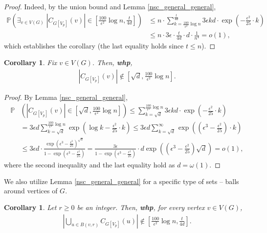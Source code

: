 \documentclass[notitlepage]{scrartcl}
\newtheorem{corollary}[thm]{Corollary}
\begin{document}
\begin{proof}
    Indeed, by the union bound and Lemma \ref{nsc_general_general},
    \begin{align*}
        \mathbb{P}\left(\exists_{v\in V(G)}\; \left|C_{G[V_p]}(v)\right|\in \left[\frac{100}{\epsilon^2}\log n, \frac{t}{4d}\right]\right)&\le n\cdot \sum_{k=\frac{100}{\epsilon^2}\log n}^{\frac{t}{4d}} 3\epsilon kd\cdot \exp\left(-\frac{\epsilon^2}{25}\cdot k\right)\\
        &\le n\cdot 3\epsilon \cdot \frac{t}{4d}\cdot d\cdot \frac{1}{n^4}=o(1),
    \end{align*}
    which establishes the corollary (the last equality holds since $t\le n$). 
\end{proof}

\begin{corollary}\label{nsc1_pre}
    Fix $v\in V(G)$. Then, \textbf{whp}, 
        \begin{align*}
            |C_{G[V_p]}(v)|\notin \left[\sqrt{d}, \frac{100}{\epsilon^2}\log n\right].
        \end{align*}
\end{corollary}

\begin{proof}
By Lemma \ref{nsc_general_general},
    \begin{align*}
        \mathbb{P}&\left( |C_{G[V_p]}(v)|\in \left[\sqrt{d},\frac{100}{\epsilon^2}\log n\right]\right)\le \sum_{k=\sqrt{d}}^{\frac{100}{\epsilon^2}\log n} 3\epsilon kd\cdot \exp\left(-\frac{\epsilon^2}{25}\cdot k\right)\\
        &=3\epsilon d \sum_{k=\sqrt{d}}^{\frac{100}{\epsilon^2}\log n}\exp\left(\log k-\frac{\epsilon^2}{25}\cdot k\right)\le 3\epsilon d \sum_{k=\sqrt{d}}^{\infty}\exp\left(\left(\epsilon^3-\frac{\epsilon^2}{25}\right)\cdot k\right)\\
        &\le 3\epsilon d\cdot \frac{\exp\left(\epsilon^3-\frac{\epsilon^2}{25}\right)^{\sqrt{d}}}{1-\exp\left(\epsilon^3-\frac{\epsilon^2}{25}\right)}=\frac{3\epsilon}{1-\exp\left(\epsilon^3-\frac{\epsilon^2}{25}\right)}\cdot d\exp\left(\left(\epsilon^3-\frac{\epsilon^2}{25}\right)\sqrt{d}\right)=o(1),
    \end{align*}
    where the second inequality and the last equality hold as $d=\omega(1)$.
\end{proof}

We also utilize Lemma \ref{nsc_general_general} for a specific type of sets -- balls around vertices of $G$.

\begin{corollary}\label{nsc_ball_pre}
    Let $r\ge 0$ be an integer. Then, \textbf{whp}, for every vertex $v\in V(G)$,
        \begin{align*}
            \left|\bigcup_{u\in B(v,r)} C_{G[V_p]}(u)\right|\notin \left[\frac{100}{\epsilon^2}\log n, \frac{t}{4d}\right].
        \end{align*}
\end{corollary}
\end{document}
